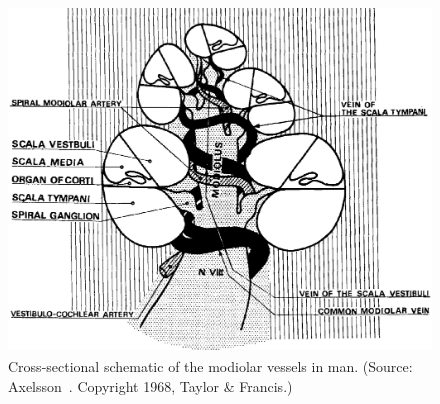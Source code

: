 \begin{figure}
	\centering
	\includegraphics[height=9.2cm]{Background/modiolar_vessels}
	\caption[Cross-sectional schematic of the modiolar vessels in
	man]{Cross-sectional schematic of the modiolar vessels in man. (Source:
	Axelsson~\cite{axelsson1968}. Copyright \textcopyright{} 1968, Taylor \&
	Francis.)}
	\label{fig:modiolar_vessels}
\end{figure}

